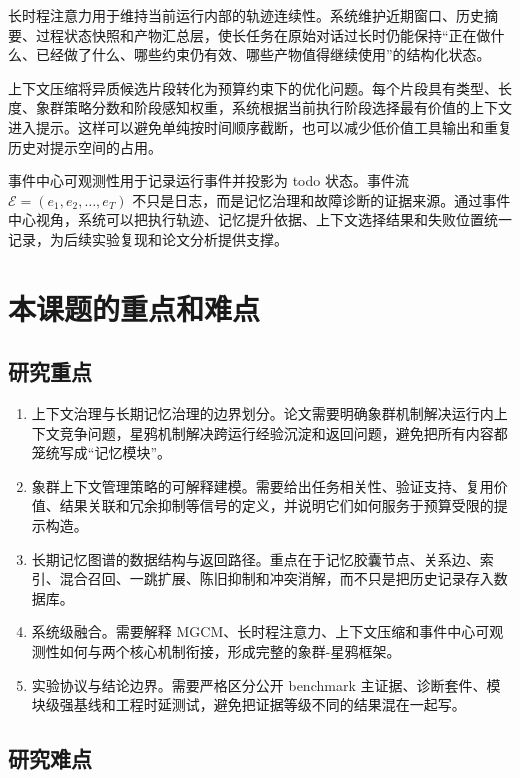 \documentclass[UTF8,a4paper,zihao=-4,fontset=windows]{ctexart}
\newcommand{\framework}{象群-星鸦框架}
\begin{document}
长时程注意力用于维持当前运行内部的轨迹连续性。系统维护近期窗口、历史摘要、过程状态快照和产物汇总层，使长任务在原始对话过长时仍能保持“正在做什么、已经做了什么、哪些约束仍有效、哪些产物值得继续使用”的结构化状态。

上下文压缩将异质候选片段转化为预算约束下的优化问题。每个片段具有类型、长度、象群策略分数和阶段感知权重，系统根据当前执行阶段选择最有价值的上下文进入提示。这样可以避免单纯按时间顺序截断，也可以减少低价值工具输出和重复历史对提示空间的占用。

事件中心可观测性用于记录运行事件并投影为 todo 状态。事件流 $\mathcal{E}=(e_1,e_2,\ldots,e_T)$ 不只是日志，而是记忆治理和故障诊断的证据来源。通过事件中心视角，系统可以把执行轨迹、记忆提升依据、上下文选择结果和失败位置统一记录，为后续实验复现和论文分析提供支撑。

\section{本课题的重点和难点}

\subsection{研究重点}

\begin{enumerate}[label=\arabic*.]
  \item 上下文治理与长期记忆治理的边界划分。论文需要明确象群机制解决运行内上下文竞争问题，星鸦机制解决跨运行经验沉淀和返回问题，避免把所有内容都笼统写成“记忆模块”。
  \item 象群上下文管理策略的可解释建模。需要给出任务相关性、验证支持、复用价值、结果关联和冗余抑制等信号的定义，并说明它们如何服务于预算受限的提示构造。
  \item 长期记忆图谱的数据结构与返回路径。重点在于记忆胶囊节点、关系边、索引、混合召回、一跳扩展、陈旧抑制和冲突消解，而不只是把历史记录存入数据库。
  \item 系统级融合。需要解释 MGCM、长时程注意力、上下文压缩和事件中心可观测性如何与两个核心机制衔接，形成完整的\framework。
  \item 实验协议与结论边界。需要严格区分公开 benchmark 主证据、诊断套件、模块级强基线和工程时延测试，避免把证据等级不同的结果混在一起写。
\end{enumerate}

\subsection{研究难点}
\end{document}

